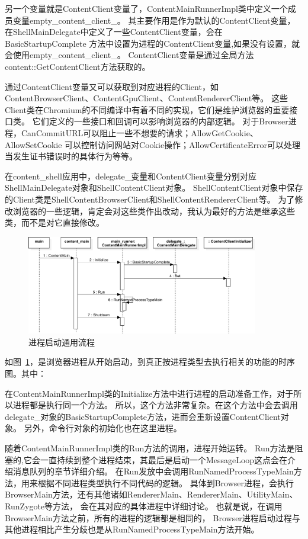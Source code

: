 另一个变量就是ContentClient变量了，ContentMainRunnerImpl类中定义一个成员变量empty\_content\_client\_。
其主要作用是作为默认的ContentClient变量，在ShellMainDelegate中定义了一些ContentClient变量，会在BasicStartupComplete
方法中设置为进程的ContentClient变量,如果没有设置，就会使用empty\_content\_client\_。
ContentClient变量是通过全局方法content::GetContentClient方法获取的。

通过ContentClient变量又可以获取到对应进程的Client，如ContentBrowserClient、ContentGpuClient、ContentRendererClient等。
这些Client类在Chromium的不同编译中有着不同的实现，它们是维护浏览器的重要接口类。
它们定义的一些接口和回调可以影响浏览器的内部逻辑。
对于Browser进程，CanCommitURL可以阻止一些不想要的请求；AllowGetCookie、AllowSetCookie
可以控制访问网站对Cookie操作；AllowCertificateError可以处理当发生证书错误时的具体行为等等。

在content\_shell应用中，delegate\_变量和ContentClient变量分别对应ShellMainDelegate对象和ShellContentClient对象。
ShellContentClient对象中保存的Client类是ShellContentBrowserClient和ShellContentRendererClient等。
为了修改浏览器的一些逻辑，肯定会对这些类作出改动，我认为最好的方法是继承这些类，而不是对它直接修改。

\begin{figure}[H] 
  \centering 
  \includegraphics[width=0.90\textwidth]{image/process_study/ContentMainRunnerSequence.pdf} 
  \caption{进程启动通用流程} \label{fig:ContentMainRunnerSequence} 
\end{figure}

如图~\ref{fig:ContentMainRunnerSequence}，是浏览器进程从开始启动，到真正按进程类型去执行相关的功能的时序图。其中：

在ContentMainRunnerImpl类的Initialize方法中进行进程的启动准备工作，对于所以进程都是执行同一个方法。
所以，这个方法非常复杂。在这个方法中会去调用delegate\_对象的BasicStartupComplete方法，进而会重新设置ContentClient对象。
另外，命令行对象的初始化也在这里进程。

随着ContentMainRunnerImpl类的Run方法的调用，进程开始运转。
Run方法是阻塞的,它会一直持续到整个进程结束，其最后是启动一个MessageLoop这点会在介绍消息队列的章节详细介绍。
在Run发放中会调用RunNamedProcessTypeMain方法，用来根据不同进程类型执行不同代码的逻辑。
具体到Browser进程，会执行BrowserMain方法，还有其他诸如RendererMain、RendererMain、UtilityMain、RunZygote等方法，
会在其对应的具体进程中详细讨论。
也就是说，在调用BrowserMain方法之前，所有的进程的逻辑都是相同的，
Browser进程启动过程与其他进程相比产生分歧也是从RunNamedProcessTypeMain方法开始。

